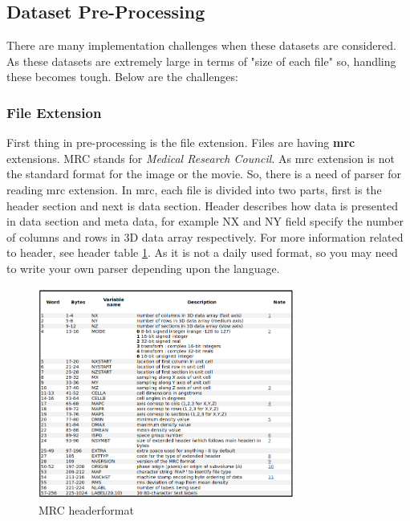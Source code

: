 \documentclass{report}
\begin{document}
\subsection{Dataset Pre-Processing}
There are many implementation challenges when these datasets are considered. As these datasets are extremely large in terms of "size of each file" so, handling these becomes tough. Below are the challenges:

\subsubsection{File Extension}
First thing in pre-processing is the file extension. Files are having  \textbf{mrc} extensions. MRC stands for \textit{Medical Research Council}. As mrc extension is not the standard format for the image or the movie. So, there is a need of parser for reading mrc extension. In mrc, each file is divided into two parts, first is the header section and next is data section. Header describes how data is presented in data section and meta data, for example NX and NY field specify the number of columns and rows in 3D data array respectively. For more information related to header, see header table \ref{fig:mrc-header}. As it is not a daily used format, so you may need to write your own parser depending upon the language.

\begin{figure}[h]
\includegraphics[width=0.75\textwidth]{mrc_header.png}
\centering
\captionsetup{justification=centering}
\caption{MRC header\protect\footnotemark format}
\label{fig:mrc-header}
\end{figure}
\end{document}
